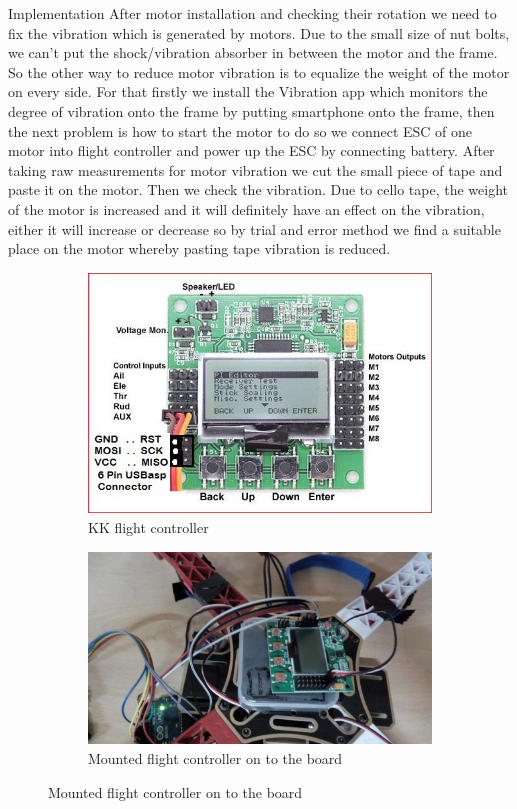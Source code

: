 \documentclass[12pt, oneside]{report}
\numberwithin{equation}{section}
\begin{document}
\begin{chapter}{Implementation}
	After motor installation and checking their rotation we need to fix the vibration which is generated by motors. Due to the small size of nut bolts, we can’t put the shock/vibration absorber in between the motor and the frame. So the other way to reduce motor vibration is to equalize the weight of the motor on every side. For that firstly we install the Vibration app which monitors the degree of vibration onto the frame by putting smartphone onto the frame, then the next problem is how to start the motor to do so we connect ESC of one motor into flight controller and power up the ESC by connecting battery. After taking raw measurements for motor vibration we cut the small piece of tape and paste it on the motor. Then we check the vibration. Due to cello tape, the weight of the motor is increased and it will definitely have an effect on the vibration, either it will increase or decrease so by trial and error method we find a suitable place on the motor whereby pasting tape vibration is reduced.

\begin{figure}[h]
\center
\begin{subfigure}[hb]{0.3\textwidth}
\includegraphics[width=\textwidth]{kk_flight}
\caption{KK flight controller}
\end{subfigure}
\begin{subfigure}[hb]{0.3\textwidth}
\includegraphics[width=\textwidth]{flight_controller}
\caption{Mounted flight controller on to the board}
\end{subfigure}
\end{figure}


\end{chapter}
\end{document}
